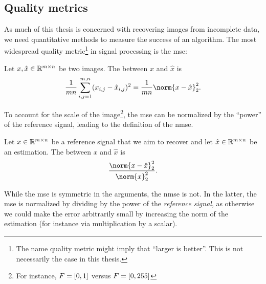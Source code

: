 \subsection{Quality metrics}
As much of this thesis is concerned with recovering images from incomplete data, we need quantitative methods to measure the success of an algorithm.
The most widespread quality metric\footnote{%
	The name quality metric might imply that \enquote{larger is better}.
	This is not necessarily the case in this thesis.
} in signal processing is the \gls{mse}:
\begin{definition}%
	\label{def:mse}
	Let \( x, \hat{x} \in \mathbb{R}^{m\times n} \) be two images.
	The \emph{} between \( x \) and \( \hat{x} \) is
	\begin{equation}
		\frac{\num{1}}{\Height\Width} \sum_{i,j=\num{1}}^{\Height,\Width} (x_{i,j} - \hat{x}_{i,j})^{\num{2}} = \frac{\num{1}}{\Height\Width}\norm{x - \hat{x}}_{\num{2}}^{\num{2}}.
	\end{equation}
\end{definition}
To account for the scale of the image\footnote{%
	For instance, \( F = \interval{\num{0}}{\num{1}} \) versus \( F = \interval{\num{0}}{\num{255}} \)%
}, the \gls{mse} can be normalized by the \enquote{power} of the reference signal, leading to the definition of the \gls{nmse}.
\begin{definition}
	\label{def:nmse}
	Let \( x \in \mathbb{R}^{m\times n} \) be a reference signal that we aim to recover and let \( \hat{x} \in \mathbb{R}^{m\times n} \) be an estimation.
	The \emph{} between \( x \) and \( \hat{x} \) is
	\begin{equation}
		\frac{\norm{x - \hat{x}}_{\num{2}}^{\num{2}}}{\norm{x}_{\num{2}}^{\num{2}}}.
	\end{equation}
\end{definition}
While the \gls{mse} is symmetric in the arguments, the \gls{nmse} is not.
In the latter, the \gls{mse} is normalized by dividing by the power of the \emph{reference signal}, as otherwise we could make the error arbitrarily small by increasing the norm of the estimation (for instance via multiplication by a scalar).

